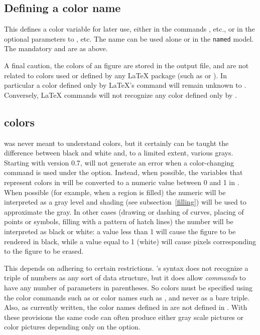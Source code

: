 \documentclass[letterpaper]{article}
\begin{document}
\subsection{Defining a color name}\label{colorname}

\begin{cd}
%
\end{cd}

This defines a color variable  for later use, either in the
commands , etc., or in the optional parameters to
, etc. The name can be used alone or in the \texttt{named} model.
The mandatory  and  are as above.

\medskip
A final caution, the colors of an \mfp{} figure are stored in the
 output file, and are not related to colors used or defined by
any \LaTeX{} package (such as  or ). In
particular a color defined only by \LaTeX{}'s  command
will remain unknown to \mfp{}. Conversely, \LaTeX{} commands will not
recognize any color defined only by .


\subsection{\CMF{} colors}\label{MFcolor}

\CMF{} was never meant to understand colors, but it certainly can be
taught the difference between black and white and, to a limited extent,
various grays. Starting with version 0.7, \mfp{} will not generate
an error when a color-changing command is used under the 
option. Instead, when possible, the variables that represent colors in
\MP{} will be converted to a numeric value between 0 and 1 in \MF{}. When
possible (for example, when a region is filled) the numeric will be
interpreted as a gray level and shading (see subsection~\ref{filling})
will be used to approximate the gray. In other cases (drawing or dashing
of curves, placing of points or symbols, filling with a pattern of hatch
lines) the number will be interpreted as black or white: a value less
than 1 will cause the figure to be rendered in black, while a value
equal to 1 (white) will cause pixels corresponding to the figure to be
erased.

This depends on adhering to certain restrictions. \CMF{}'s syntax
does not recognize a triple of numbers as any sort of data structure,
but it does allow \emph{commands} to have any number of parameters in
parentheses. So colors must be specified using the color commands such
as  or color names such as , and never as a
bare triple. Also, as currently written, the color names defined in
 are not defined in \MF{}. With these provisions the
same \mfp{} code can often produce either gray scale \MF{} pictures or
\MP{} color pictures depending only on the  option.
\end{document}
